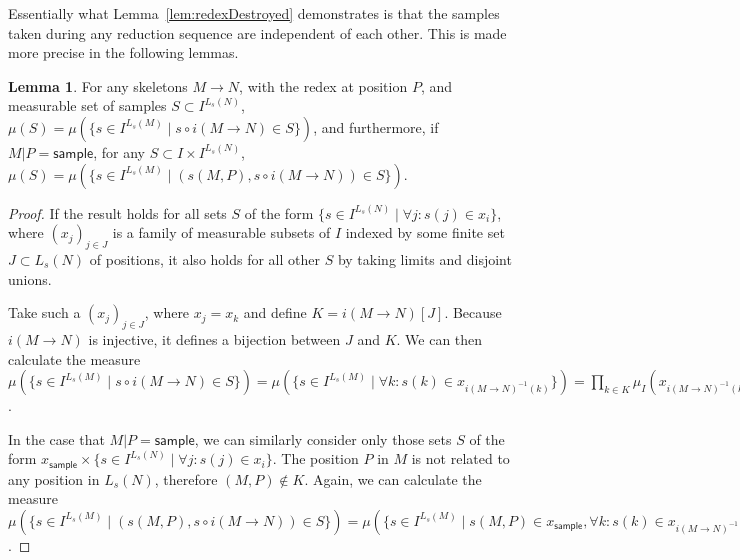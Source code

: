 \documentclass{article}
\newcommand{\tsample}{\mathsf{sample}}
\theoremstyle{definition}
\theoremstyle{lemma}
\newtheorem{lemma}{Lemma}
\theoremstyle{remark}
\begin{document}
Essentially what Lemma~\ref{lem:redexDestroyed} demonstrates is that the samples taken during any reduction sequence are independent of each other. This is made more precise in the following lemmas.

\begin{lemma}
For any skeletons $M \to N$, with the redex at position $P$, and measurable set of samples $S \subset I^{L_s(N)}$, $\mu(S) = \mu(\{s \in I^{L_s(M)} \mid s \circ i(M \to N) \in S\})$, and furthermore, if $M | P = \tsample$, for any $S \subset I \times I^{L_s(N)}$, $\mu(S) = \mu(\{s \in I^{L_s(M)} \mid (s(M,P), s \circ i(M \to N)) \in S\})$.
\end{lemma}
\begin{proof}
If the result holds for all sets $S$ of the form $\{s \in I^{L_s(N)} \mid \forall j : s(j) \in x_i\}$, where $(x_j)_{j \in J}$ is a family of measurable subsets of $I$ indexed by some finite set $J \subset L_s(N)$ of positions, it also holds for all other $S$ by taking limits and disjoint unions.

Take such a $(x_j)_{j \in J}$, where $x_j = x_k$ and define $K = i(M \to N)[J]$. Because $i(M \to N)$ is injective, it defines a bijection between $J$ and $K$. We can then calculate the measure $\mu(\{s \in I^{L_s(M)} \mid s \circ i(M \to N) \in S\}) = \mu(\{s \in I^{L_s(M)} \mid \forall k : s(k) \in x_{i(M \to N)^{-1}(k)}\}) = \prod_{k \in K} \mu_I(x_{i(M \to N)^{-1}(k)}) = \prod_{j \in J} \mu_I(x_j) = \mu(S)$.

In the case that $M|P = \tsample$, we can similarly consider only those sets $S$ of the form $x_\tsample \times \{s \in I^{L_s(N)} \mid \forall j : s(j) \in x_i\}$. The position $P$ in $M$ is not related to any position in $L_s(N)$, therefore $(M,P) \not \in K$. Again, we can calculate the measure $\mu(\{s \in I^{L_s(M)} \mid (s(M,P), s \circ i(M \to N)) \in S\}) = \mu(\{s \in I^{L_s(M)} \mid s(M,P) \in x_\tsample, \forall k : s(k) \in x_{i(M \to N)^{-1}(k)}\}) = \mu_I(x_\tsample) \prod_{k \in K} \mu_I(x_{i(M \to N)^{-1}(k)}) = \mu_I(x_\tsample) \prod_{j \in J} \mu_I(x_j) = \mu(S)$.
\end{proof}
\end{document}
